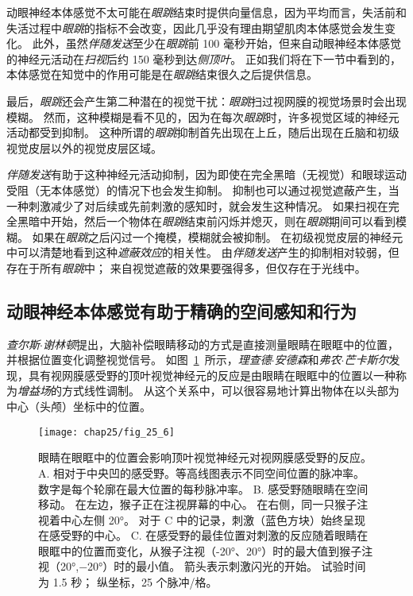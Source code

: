动眼神经本体感觉不太可能在\textit{眼跳}结束时提供向量信息，因为平均而言，失活前和失活过程中\textit{眼跳}的指标不会改变，因此几乎没有理由期望肌肉本体感觉会发生变化。
此外，虽然\textit{伴随发送}至少在\textit{眼跳}前 100 毫秒开始，但来自动眼神经本体感觉的神经元活动在\textit{扫视}后约 150 毫秒到达\textit{侧顶叶}。
正如我们将在下一节中看到的，本体感觉在知觉中的作用可能是在\textit{眼跳}结束很久之后提供信息。


最后，\textit{眼跳}还会产生第二种潜在的视觉干扰：\textit{眼跳}扫过视网膜的视觉场景时会出现模糊。
然而，这种模糊是看不见的，因为在每次\textit{眼跳}时，许多视觉区域的神经元活动都受到抑制。
这种所谓的\textit{眼跳}抑制首先出现在上丘，随后出现在丘脑和初级视觉皮层以外的视觉皮层区域。


\textit{伴随发送}有助于这种神经元活动抑制，因为即使在完全黑暗（无视觉）和眼球运动受阻（无本体感觉）的情况下也会发生抑制。
抑制也可以通过视觉遮蔽产生，当一种刺激减少了对后续或先前刺激的感知时，就会发生这种情况。
如果扫视在完全黑暗中开始，然后一个物体在\textit{眼跳}结束前闪烁并熄灭，则在\textit{眼跳}期间可以看到模糊。
如果在\textit{眼跳}之后闪过一个掩模，模糊就会被抑制。
在初级视觉皮层的神经元中可以清楚地看到这种\textit{遮蔽效应}的相关性。
由\textit{伴随发送}产生的抑制相对较弱，但存在于所有\textit{眼跳}中；
来自视觉遮蔽的效果要强得多，但仅存在于光线中。



\subsection{动眼神经本体感觉有助于精确的空间感知和行为}

\textit{查尔斯$\cdot$谢林顿}提出，大脑补偿眼睛移动的方式是直接测量眼睛在眼眶中的位置，并根据位置变化调整视觉信号。
如图~\ref{fig:25_6}~所示，\textit{理查德$\cdot$安德森}和\textit{弗农$\cdot$芒卡斯尔}发现，具有视网膜感受野的顶叶视觉神经元的反应是由眼睛在眼眶中的位置以一种称为\textit{增益场}的方式线性调制。
从这个关系中，可以很容易地计算出物体在以头部为中心（头颅）坐标中的位置。


\begin{figure}[htbp]
	\centering
	\texttt{[image: chap25/fig\_25\_6]}
	\caption{眼睛在眼眶中的位置会影响顶叶视觉神经元对视网膜感受野的反应。
		A. 相对于中央凹的感受野。等高线图表示不同空间位置的脉冲率。
		数字是每个轮廓在最大位置的每秒脉冲率。
		B. 感受野随眼睛在空间移动。
		在左边，猴子正在注视屏幕的中心。
		在右侧，同一只猴子注视着中心左侧 20°。
		对于 C 中的记录，刺激（蓝色方块）始终呈现在感受野的中心。
		C. 在感受野的最佳位置对刺激的反应随着眼睛在眼眶中的位置而变化，从猴子注视（-20°、20°）时的最大值到猴子注视（20°,−20°）时的最小值。
		箭头表示刺激闪光的开始。
		试验时间为 1.5 秒；
		纵坐标，25 个脉冲/格\cite{andersen1985encoding}。}
	\label{fig:25_6}
\end{figure}


